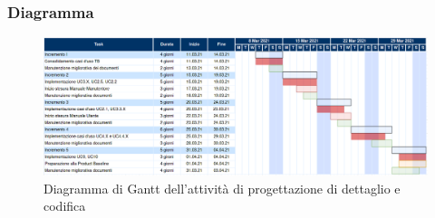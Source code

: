 	\subsubsection{Diagramma}
		\begin{figure}[H]
        		\centering
        		\includegraphics[width=\textwidth]{source/img/Progettazionedettaglio_codifica.png}
        		\caption{Diagramma di Gantt dell'attività di progettazione di dettaglio e codifica}
    		\end{figure}
